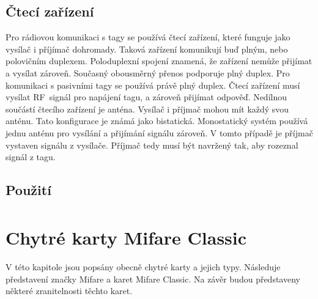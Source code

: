 \section{Čtecí zařízení}
Pro rádiovou komunikaci s tagy se používá čtecí zařízení, které funguje jako vysílač i příjímač dohromady. Taková zařízení komunikují buď plným, nebo polovičním duplexem. Poloduplexní spojení znamená, že zařízení nemůže přijímat a vysílat zároveň. Současný obousměrný přenos podporuje plný duplex. Pro komunikaci s pasivními tagy se používá právě plný duplex. Čtecí zařízení musí vysílat RF~signál pro napájení tagu, a zároveň přijímat odpověď.
Nedílnou součástí čtecího zařízení je anténa. Vysílač i příjmač mohou mít každý svou anténu. Tato konfigurace je známá jako bistatická. Monostatický systém používá jednu anténu pro vysílání a přijímání signálu zároveň. V tomto případě je příjmač vystaven signálu z vysílače. Příjmač tedy musí být navržený tak, aby rozeznal signál z tagu\cite{The_RF_in_RFID}.\par

\section{Použití}

              
\chapter{Chytré karty Mifare Classic\textsuperscript{\textregistered}}
\label{chytre_karty}
V této kapitole jsou popsány obecně chytré karty a jejich typy. Následuje představení značky Mifare a karet Mifare Classic. Na závěr budou představeny některé zranitelnosti těchto karet.

